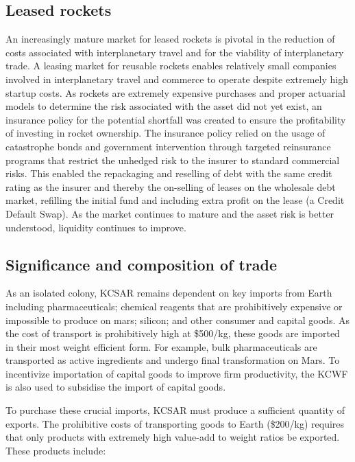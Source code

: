 \documentclass[fleqn,10pt]{Stylesheet} %
\begin{document}
\subsection{Leased rockets}
An increasingly mature market for leased rockets is pivotal in the reduction of costs associated with interplanetary travel and for the viability of interplanetary trade. A leasing market for reusable rockets enables relatively small companies involved in interplanetary travel and commerce to operate despite extremely high startup costs. As rockets are extremely expensive purchases and proper actuarial models to determine the risk associated with the asset did not yet exist, an insurance policy for the potential shortfall was created to ensure the profitability of investing in rocket ownership. The insurance policy relied on the usage of catastrophe bonds and government intervention through targeted reinsurance programs that restrict the unhedged risk to the insurer to standard commercial risks. This enabled the repackaging and reselling of debt with the same credit rating as the insurer and thereby the on-selling of leases on the wholesale debt market, refilling the initial fund and including extra profit on the lease (a Credit Default Swap). As the market continues to mature and the asset risk is better understood, liquidity continues to improve.

\subsection{Significance and composition of trade}
As an isolated colony, KCSAR remains dependent on key imports from Earth including pharmaceuticals; chemical reagents that are prohibitively expensive or impossible to produce on mars; silicon; and other consumer and capital goods. As the cost of transport is prohibitively high at \$500/kg, these goods are imported in their most weight efficient form. For example, bulk pharmaceuticals are transported as active ingredients and undergo final transformation on Mars. To incentivize importation of capital goods to improve firm productivity, the KCWF is also used to subsidise the import of capital goods. 

To purchase these crucial imports, KCSAR must produce a sufficient quantity of exports. The prohibitive costs of transporting goods to Earth (\$200/kg) requires that only products with extremely high value-add to weight ratios be exported. These products include:
\end{document}
